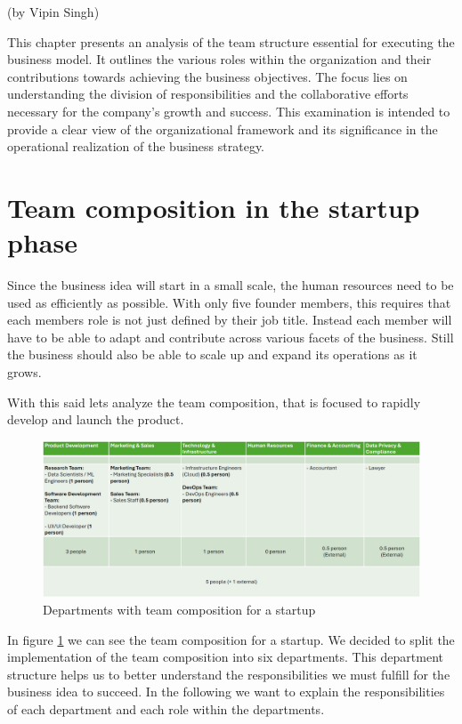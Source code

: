 (by Vipin Singh)

\p
This chapter presents an analysis of the team structure essential for executing the business model.
It outlines the various roles within the organization and their contributions towards achieving the business objectives.
The focus lies on understanding the division of responsibilities and the collaborative efforts necessary for the company's growth and success.
This examination is intended to provide a clear view of the organizational framework and its significance in the operational realization of the business strategy.

\section{Team composition in the startup phase}
Since the business idea will start in a small scale, the human resources need to be used as efficiently as possible.
With only five founder members, this requires that each members role is not just defined by their job title.
Instead each member will have to be able to adapt and contribute across various facets of the business.
Still the business should also be able to scale up and expand its operations as it grows.

\p
With this said lets analyze the team composition, that is focused to rapidly develop and launch the product.

\begin{figure}[H]
    \centering
    \includegraphics[width=\textwidth]{figures/team_comp_startup.png}
    \caption{Departments with team composition for a startup}
    \label{fig:team_comp_startup}
\end{figure}

In figure \ref{fig:team_comp_startup} we can see the team composition for a startup.
We decided to split the implementation of the team composition into six departments.
This department structure helps us to better understand the responsibilities we must fulfill for the business idea to succeed.
In the following we want to explain the responsibilities of each department and each role within the departments.

